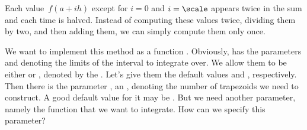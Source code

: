 Each value~$f(a+ih)$ except for $i=0$ and $i=\scale$ appears twice in the sum and each time is halved.
Instead of computing these values twice, dividing them by two, and then adding them, we can simply compute them only once.

We want to implement this method as a function .
Obviously,  has the parameters  and  denoting the limits of the interval to integrate over.
We allow them to be either  or , denoted by the  .
Let's give them the default values  and , respectively.
Then there is the parameter , an , denoting the number of trapezoids we need to construct.
A good default value for it may be .
But we need another parameter, namely the function  that we want to integrate.
How can we specify this parameter?

